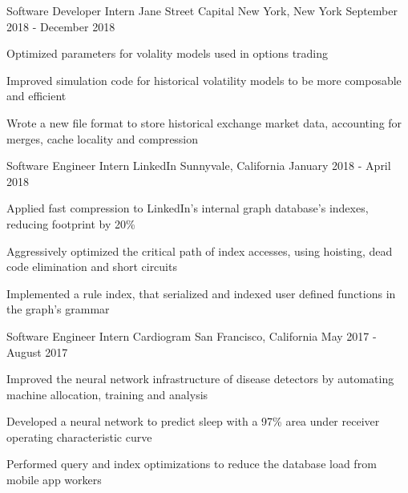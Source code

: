 


\begin{cventries}


\cventry
{Software Developer Intern}
{Jane Street Capital}
{New York, New York}
{September 2018 - December 2018}
{ %
\begin{cvitems}
\item {Optimized parameters for volality models used in options trading}
\item {Improved simulation code for historical volatility models to be more composable and efficient}
\item {Wrote a new file format to store historical exchange market data,
      accounting for merges, cache locality and compression}
\end{cvitems}
}


\cventry
{Software Engineer Intern}
{LinkedIn}
{Sunnyvale, California}
{January 2018 - April 2018}
{ %
\begin{cvitems}
\item {Applied fast compression to LinkedIn's internal graph database's indexes, reducing footprint by 20\%}
\item {Aggressively optimized the critical path of index accesses,
      using hoisting, dead code elimination and short circuits}
\item {Implemented a rule index, that serialized and indexed user defined functions in the graph's grammar}
\end{cvitems}
}


\cventry
{Software Engineer Intern}
{Cardiogram}
{San Francisco, California}
{May 2017 - August 2017}
{ %
\begin{cvitems}
\item {Improved the neural network infrastructure of disease detectors by automating machine allocation, training and analysis}
\item {Developed a neural network to predict sleep with a 97\% area under receiver operating characteristic curve}
\item {Performed query and index optimizations to reduce the database load from mobile app workers}
\end{cvitems}
}


\end{cventries}
